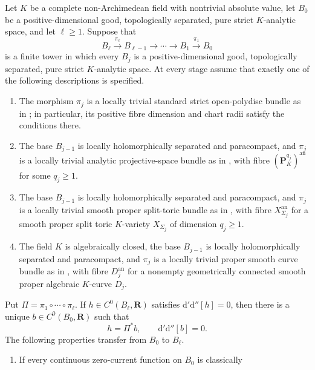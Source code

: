 \begin{proposition}
\label{prop:p062-mixed-exact-bundle-tower-transfer}
Let $K$ be a complete non-Archimedean field with nontrivial absolute
value, let $B_0$ be a positive-dimensional good, topologically separated,
pure strict $K$-analytic space, and let $\ell\geq1$.  Suppose that
\[
 B_\ell\xrightarrow{\pi_\ell}B_{\ell-1}
 \longrightarrow\cdots\longrightarrow B_1
 \xrightarrow{\pi_1}B_0
\]
is a finite tower in which every $B_j$ is a positive-dimensional good,
topologically separated, pure strict $K$-analytic space.  At every stage
assume that exactly one of the following descriptions is specified.
\begin{enumerate}
\item The morphism $\pi_j$ is a locally trivial standard strict
open-polydisc bundle as in
; in particular, its positive
fibre dimension and chart radii satisfy the conditions there.
\item The base $B_{j-1}$ is locally holomorphically separated and
paracompact, and $\pi_j$ is a locally trivial analytic projective-space
bundle as in , with fibre
$(\mathbf P_K^{q_j})^{\mathrm{an}}$ for some $q_j\geq1$.
\item The base $B_{j-1}$ is locally holomorphically separated and
paracompact, and $\pi_j$ is a locally trivial smooth proper split-toric
bundle as in
, with fibre
$X_{\Sigma_j}^{\mathrm{an}}$ for a smooth proper split toric $K$-variety
$X_{\Sigma_j}$ of dimension $q_j\geq1$.
\item The field $K$ is algebraically closed, the base $B_{j-1}$ is locally
holomorphically separated and paracompact, and $\pi_j$ is a locally trivial
proper smooth curve bundle as in
, with fibre
$D_j^{\mathrm{an}}$ for a nonempty geometrically connected smooth proper
algebraic $K$-curve $D_j$.
\end{enumerate}
Put $\Pi=\pi_1\circ\cdots\circ\pi_\ell$.  If
$h\in C^0(B_\ell,\mathbf R)$ satisfies
$\mathrm d'\mathrm d''[h]=0$, then there is a unique
$b\in C^0(B_0,\mathbf R)$ such that
\[
                  h=\Pi^*b,
                  \qquad \mathrm d'\mathrm d''[b]=0.
\]
The following properties transfer from $B_0$ to $B_\ell$.
\begin{enumerate}
\item If every continuous zero-current function on $B_0$ is classically

\end{enumerate}
\end{proposition}
